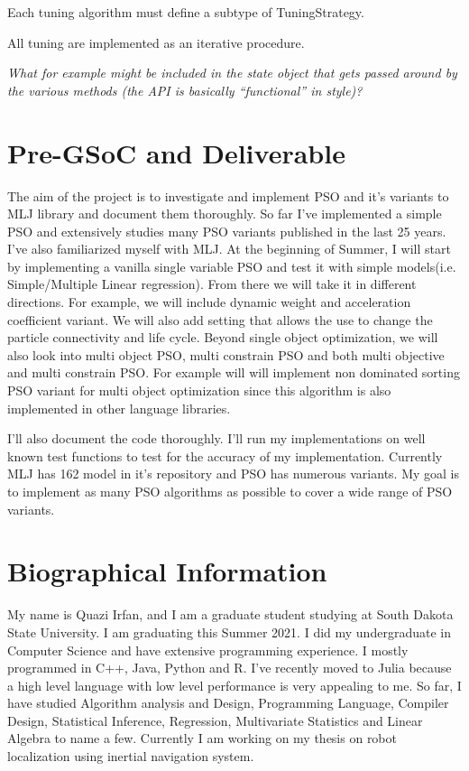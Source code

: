 \documentclass{article}
\begin{document}
Each tuning algorithm must define a subtype of TuningStrategy.

All tuning are implemented as an iterative procedure.






\textit{What for example might be included in the state object that gets passed around by the various methods (the API is basically “functional” in style)?}

\section{Pre-GSoC and Deliverable}
The aim of the project is to investigate and implement PSO and it's variants to MLJ library and document them thoroughly. So far I've implemented a simple PSO and extensively studies many PSO variants published in the last 25 years. I've also familiarized myself with MLJ. At the beginning of Summer, I will start by implementing a vanilla single variable PSO and test it with simple models(i.e. Simple/Multiple Linear regression). From there we will take it in different directions. For example, we will include dynamic weight and acceleration coefficient variant. We will also add setting that allows the use to change the particle connectivity and life cycle. Beyond single object optimization, we will also look into multi object PSO, multi constrain PSO and both multi objective and multi constrain PSO. For example will will implement non dominated sorting PSO variant for multi object optimization since this algorithm is also implemented in other language libraries.

I'll also document the code thoroughly. I'll run my implementations on well known test functions to test for the accuracy of my implementation. Currently MLJ has 162 model in it's repository and PSO has numerous variants. My goal is to implement as many PSO algorithms as possible to cover a wide range of PSO variants.


\section{Biographical Information}
My name is Quazi Irfan, and I am a graduate student studying at South Dakota State University. I am graduating this Summer 2021. I did my undergraduate in Computer Science and have extensive programming experience. I mostly programmed in C++, Java, Python and R. I've recently moved to Julia because a high level language with low level performance is very appealing to me. So far, I have studied Algorithm analysis and Design, Programming Language, Compiler Design, Statistical Inference, Regression, Multivariate Statistics and Linear Algebra to name a few. Currently I am working on my thesis on robot localization using inertial navigation system.
\end{document}
